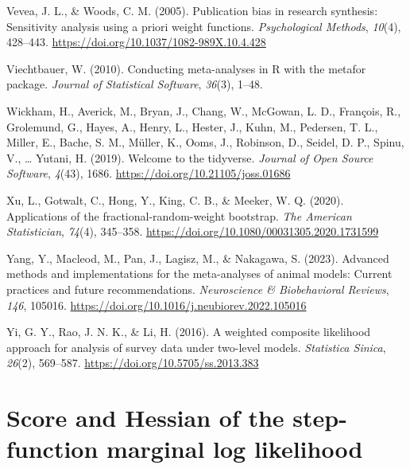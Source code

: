 \documentclass[
  man, donotrepeattitle,floatsintext]{apa7}
\newlength{\cslhangindent}
\newenvironment{CSLReferences}[2] %
 {\begin{list}{}{%
  \setlength{\itemindent}{0pt}
  \setlength{\leftmargin}{0pt}
  \setlength{\parsep}{0pt}
  \ifodd #1
   \setlength{\leftmargin}{\cslhangindent}
   \setlength{\itemindent}{-1\cslhangindent}
  \fi
  \setlength{\itemsep}{#2\baselineskip}}}
 {\end{list}}
\begin{document}
\begin{CSLReferences}{1}{0}
Vevea, J. L., \& Woods, C. M. (2005). Publication bias in research synthesis: Sensitivity analysis using a priori weight functions. \emph{Psychological Methods}, \emph{10}(4), 428--443. \url{https://doi.org/10.1037/1082-989X.10.4.428}

Viechtbauer, W. (2010). {Conducting meta-analyses in R with the metafor package}. \emph{Journal of Statistical Software}, \emph{36}(3), 1--48.

Wickham, H., Averick, M., Bryan, J., Chang, W., McGowan, L. D., François, R., Grolemund, G., Hayes, A., Henry, L., Hester, J., Kuhn, M., Pedersen, T. L., Miller, E., Bache, S. M., Müller, K., Ooms, J., Robinson, D., Seidel, D. P., Spinu, V., \ldots{} Yutani, H. (2019). Welcome to the {tidyverse}. \emph{Journal of Open Source Software}, \emph{4}(43), 1686. \url{https://doi.org/10.21105/joss.01686}

Xu, L., Gotwalt, C., Hong, Y., King, C. B., \& Meeker, W. Q. (2020). Applications of the fractional-random-weight bootstrap. \emph{The American Statistician}, \emph{74}(4), 345--358. \url{https://doi.org/10.1080/00031305.2020.1731599}

Yang, Y., Macleod, M., Pan, J., Lagisz, M., \& Nakagawa, S. (2023). Advanced methods and implementations for the meta-analyses of animal models: {Current} practices and future recommendations. \emph{Neuroscience \& Biobehavioral Reviews}, \emph{146}, 105016. \url{https://doi.org/10.1016/j.neubiorev.2022.105016}

Yi, G. Y., Rao, J. N. K., \& Li, H. (2016). A weighted composite likelihood approach for analysis of survey data under two-level models. \emph{Statistica Sinica}, \emph{26}(2), 569--587. \url{https://doi.org/10.5705/ss.2013.383}

\end{CSLReferences}

\endgroup

\appendix


\section{Score and Hessian of the step-function marginal log likelihood}\label{CML-derivatives}
\end{document}
